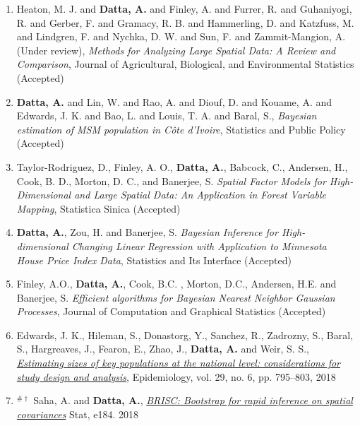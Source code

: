 \documentclass[11pt,a4paper,sans]{moderncv} %
\begin{document}
{\begin{enumerate}
\item \vskip 4mm Heaton, M. J. and \textbf{Datta, A.} and Finley, A. and Furrer, R. and Guhaniyogi, R. and Gerber, F. and Gramacy, R. B. and Hammerling, D. and Katzfuss, M. and Lindgren, F. and Nychka, D. W. and Sun, F. and Zammit-Mangion, A. (Under review), {\em Methods for Analyzing Large Spatial Data: A Review and Comparison}, Journal of Agricultural, Biological, and Environmental Statistics (Accepted)
	
\item \vskip 4mm \textbf{Datta, A.} and Lin, W. and Rao, A. and Diouf, D. and Kouame, A. and Edwards, J. K. and Bao, L. and Louis, T. A. and Baral, S., {\em Bayesian estimation of MSM population in C{\^o}te d'Ivoire}, Statistics and Public Policy (Accepted)

\item \vskip 4mm Taylor-Rodriguez, D., Finley, A. O.,  \textbf{Datta, A.}, Babcock, C., Andersen, H., Cook, B. D., Morton, D. C.,  and Banerjee, S. {\em Spatial Factor Models for High-Dimensional and Large Spatial Data: An Application in Forest Variable Mapping}, Statistica Sinica (Accepted)
	
\item \vskip 4mm \textbf{Datta, A.}, Zou, H. and Banerjee, S. {\em Bayesian Inference for High-dimensional Changing Linear Regression with Application to Minnesota House Price Index Data}, Statistics and Its Interface (Accepted)
	
\item \vskip 4mm Finley, A.O., \textbf{Datta, A.}, Cook, B.C. ,  Morton, D.C., Andersen, H.E. and Banerjee, S. {\em Efficient algorithms for Bayesian Nearest Neighbor Gaussian Processes}, Journal of Computation and Graphical Statistics (Accepted)	
	
\item \vskip 4mm Edwards, J. K., Hileman, S., Donastorg, Y., Sanchez, R., Zadrozny, S., Baral, S., Hargreaves, J., Fearon, E., Zhao, J., \textbf{Datta, A.} and Weir, S. S.,  {\em \href{https://journals.lww.com/epidem/Fulltext/2018/11000/Estimating_Sizes_of_Key_Populations_at_the.7.aspx}{Estimating sizes of key populations at the national level: considerations for study design and analysis}}, Epidemiology, vol. 29,  no. 6, pp. 795--803, 2018

\item \vskip 4mm $^{\# \dagger}$ Saha, A. and \textbf{Datta, A.}, \href{https://onlinelibrary.wiley.com/doi/abs/10.1002/sta4.184}{\em BRISC: Bootstrap for rapid inference on spatial covariances} Stat, e184. 2018


\end{enumerate}}
\end{document}

